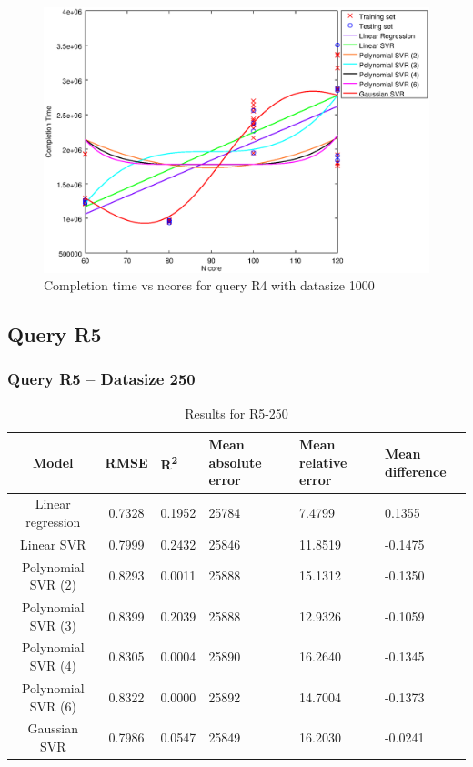 \documentclass[a4paper,11pt]{article}
\begin{document}
\begin {figure}[hbtp]
\centering
\includegraphics[width=\textwidth]{output/R4_1000_ONLY_1_LINEAR_NCORE/plot_R4_1000.eps}
\caption{Completion time vs ncores for query R4 with datasize 1000}
\label{fig:coreonly_linear_R4_1000}
\end {figure}

\newpage
\subsection{Query R5}
\subsubsection{Query R5 -- Datasize 250}
\begin{table}[H]
	\centering
	\begin{adjustbox}{center}
		\begin{tabular}{c | c M{1.2cm} M{2.5cm} M{2.5cm} M{1.8cm}}
			Model & RMSE & R\textsuperscript{2} & Mean absolute error & Mean relative error & Mean difference \tabularnewline
			\hline
			Linear regression & 0.7328 & 0.1952 &  25784 & 7.4799 & 0.1355 \\
			Linear SVR & 0.7999 & 0.2432 &  25846 & 11.8519 & -0.1475 \\
			Polynomial SVR (2) & 0.8293 & 0.0011 &  25888 & 15.1312 & -0.1350 \\
			Polynomial SVR (3) & 0.8399 & 0.2039 &  25888 & 12.9326 & -0.1059 \\
			Polynomial SVR (4) & 0.8305 & 0.0004 &  25890 & 16.2640 & -0.1345 \\
			Polynomial SVR (6) & 0.8322 & 0.0000 &  25892 & 14.7004 & -0.1373 \\
			Gaussian SVR & 0.7986 & 0.0547 &  25849 & 16.2030 & -0.0241 \\
		\end{tabular}
	\end{adjustbox}
	\\
	\caption{Results for R5-250}
	\label{fig:coreonly_linear_R5_250}
\end{table}
\end{document}
